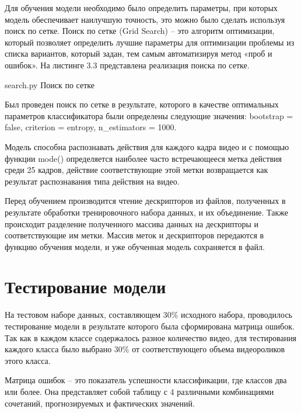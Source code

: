 Для обучения модели необходимо было определить параметры, при которых модель обеспечивает наилучшую точность, это можно было сделать используя поиск по сетке. Поиск по сетке (Grid Search) -- это алгоритм оптимизации, который позволяет определить лучшие параметры для оптимизации проблемы из списка вариантов, который задан, тем самым автоматизируя метод «проб и ошибок». На листинге 3.3 представлена реализация поиска по сетке.

{search.py} %
{Поиск по сетке} %

Был проведен поиск по сетке в результате, которого в качестве оптимальных параметров классификатора были определены следующие значения: bootstrap = false, criterion = entropy, n\_estimators = 1000.

Модель способна распознавать действия для каждого кадра видео и с помощью функции mode() определяется наиболее часто встречающееся метка действия среди 25 кадров, действие соответствующие этой метки возвращается как результат распознавания типа действия на видео.

 Перед обучением производится чтение дескрипторов из файлов, полученных в результате обработки тренировочного набора данных, и их объединение. Также происходит разделение полученного массива данных на дескрипторы и соответствующие им метки. Массив меток и дескрипторов передаются в функцию обучения модели, и уже обученная модель сохраняется в файл.




\section{Тестирование модели}\label{test}
На тестовом наборе данных, составляющем 30\% исходного набора, проводилось тестирование модели в результате которого была сформирована матрица ошибок. Так как в каждом классе содержалось разное количество видео, для тестирования каждого класса было выбрано 30\% от соответствующего объема видеороликов этого класса. 

Матрица ошибок -- это показатель успешности классификации, где классов два или более. Она представляет собой таблицу с 4 различными комбинациями сочетаний, прогнозируемых и фактических значений.

